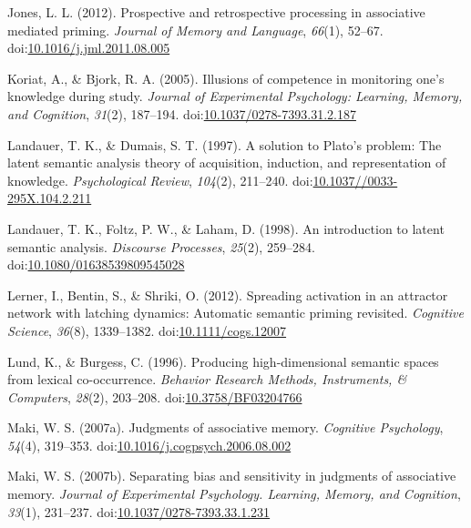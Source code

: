 \documentclass[english,,man]{apa6}
\begin{document}
\leavevmode\hypertarget{ref-Jones2012a}{}%
Jones, L. L. (2012). Prospective and retrospective processing in associative mediated priming. \emph{Journal of Memory and Language}, \emph{66}(1), 52--67. doi:\href{https://doi.org/10.1016/j.jml.2011.08.005}{10.1016/j.jml.2011.08.005}

\leavevmode\hypertarget{ref-Koriat2005}{}%
Koriat, A., \& Bjork, R. A. (2005). Illusions of competence in monitoring one's knowledge during study. \emph{Journal of Experimental Psychology: Learning, Memory, and Cognition}, \emph{31}(2), 187--194. doi:\href{https://doi.org/10.1037/0278-7393.31.2.187}{10.1037/0278-7393.31.2.187}

\leavevmode\hypertarget{ref-Landauer1997}{}%
Landauer, T. K., \& Dumais, S. T. (1997). A solution to Plato's problem: The latent semantic analysis theory of acquisition, induction, and representation of knowledge. \emph{Psychological Review}, \emph{104}(2), 211--240. doi:\href{https://doi.org/10.1037//0033-295X.104.2.211}{10.1037//0033-295X.104.2.211}

\leavevmode\hypertarget{ref-Landauer1998}{}%
Landauer, T. K., Foltz, P. W., \& Laham, D. (1998). An introduction to latent semantic analysis. \emph{Discourse Processes}, \emph{25}(2), 259--284. doi:\href{https://doi.org/10.1080/01638539809545028}{10.1080/01638539809545028}

\leavevmode\hypertarget{ref-Lerner2012}{}%
Lerner, I., Bentin, S., \& Shriki, O. (2012). Spreading activation in an attractor network with latching dynamics: Automatic semantic priming revisited. \emph{Cognitive Science}, \emph{36}(8), 1339--1382. doi:\href{https://doi.org/10.1111/cogs.12007}{10.1111/cogs.12007}

\leavevmode\hypertarget{ref-Lund1996}{}%
Lund, K., \& Burgess, C. (1996). Producing high-dimensional semantic spaces from lexical co-occurrence. \emph{Behavior Research Methods, Instruments, \& Computers}, \emph{28}(2), 203--208. doi:\href{https://doi.org/10.3758/BF03204766}{10.3758/BF03204766}

\leavevmode\hypertarget{ref-Maki2007a}{}%
Maki, W. S. (2007a). Judgments of associative memory. \emph{Cognitive Psychology}, \emph{54}(4), 319--353. doi:\href{https://doi.org/10.1016/j.cogpsych.2006.08.002}{10.1016/j.cogpsych.2006.08.002}

\leavevmode\hypertarget{ref-Maki2007}{}%
Maki, W. S. (2007b). Separating bias and sensitivity in judgments of associative memory. \emph{Journal of Experimental Psychology. Learning, Memory, and Cognition}, \emph{33}(1), 231--237. doi:\href{https://doi.org/10.1037/0278-7393.33.1.231}{10.1037/0278-7393.33.1.231}
\end{document}
